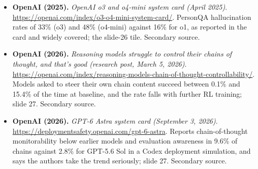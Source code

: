 \documentclass[11pt,letterpaper]{article}
\begin{document}
\begin{itemize}[leftmargin=1.2em,itemsep=3pt]
\item \textbf{OpenAI (2025).} \textit{OpenAI o3 and o4-mini system card (April 2025)}. \url{https://openai.com/index/o3-o4-mini-system-card/}. PersonQA hallucination rates of 33\% (o3) and 48\% (o4-mini) against 16\% for o1, as reported in the card and widely covered; the slide-26 tile. Secondary source.
\item \textbf{OpenAI (2026).} \textit{Reasoning models struggle to control their chains of thought, and that's good (research post, March 5, 2026)}. \url{https://openai.com/index/reasoning-models-chain-of-thought-controllability/}. Models asked to steer their own chain content succeed between 0.1\% and 15.4\% of the time at baseline, and the rate falls with further RL training; slide 27. Secondary source.
\item \textbf{OpenAI (2026).} \textit{GPT-6 Astra system card (September 3, 2026)}. \url{https://deploymentsafety.openai.com/gpt-6-astra}. Reports chain-of-thought monitorability below earlier models and evaluation awareness in 9.6\% of chains against 2.8\% for GPT-5.6 Sol in a Codex deployment simulation, and says the authors take the trend seriously; slide 27. Secondary source.
\end{itemize}
\end{document}

